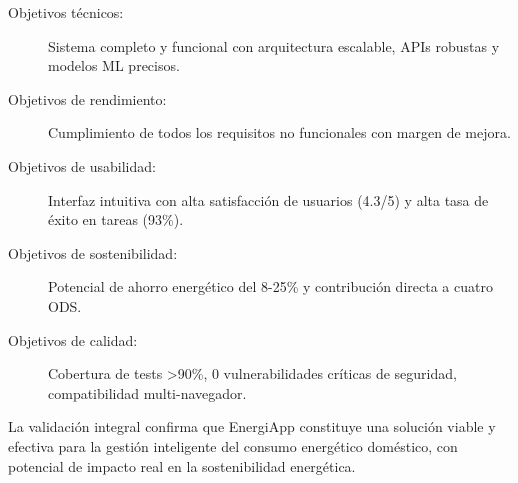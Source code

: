\begin{description}
    \item[Objetivos técnicos:] Sistema completo y funcional con arquitectura escalable, APIs robustas y modelos ML precisos.
    
    \item[Objetivos de rendimiento:] Cumplimiento de todos los requisitos no funcionales con margen de mejora.
    
    \item[Objetivos de usabilidad:] Interfaz intuitiva con alta satisfacción de usuarios (4.3/5) y alta tasa de éxito en tareas (93\%).
    
    \item[Objetivos de sostenibilidad:] Potencial de ahorro energético del 8-25\% y contribución directa a cuatro ODS.
    
    \item[Objetivos de calidad:] Cobertura de tests >90\%, 0 vulnerabilidades críticas de seguridad, compatibilidad multi-navegador.
\end{description}

La validación integral confirma que EnergiApp constituye una solución viable y efectiva para la gestión inteligente del consumo energético doméstico, con potencial de impacto real en la sostenibilidad energética.
